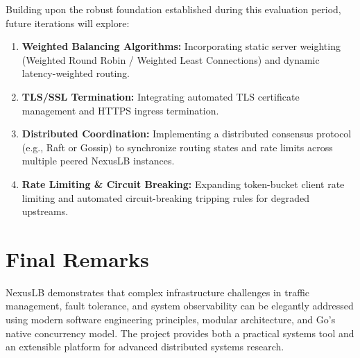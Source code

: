 \documentclass[12pt,openany]{report}
\begin{document}
Building upon the robust foundation established during this evaluation period, future iterations will explore:
\begin{enumerate}
  \item \textbf{Weighted Balancing Algorithms:} Incorporating static server weighting (Weighted Round Robin / Weighted Least Connections) and dynamic latency-weighted routing.
  \item \textbf{TLS/SSL Termination:} Integrating automated TLS certificate management and HTTPS ingress termination.
  \item \textbf{Distributed Coordination:} Implementing a distributed consensus protocol (e.g., Raft or Gossip) to synchronize routing states and rate limits across multiple peered NexusLB instances.
  \item \textbf{Rate Limiting \& Circuit Breaking:} Expanding token-bucket client rate limiting and automated circuit-breaking tripping rules for degraded upstreams.
\end{enumerate}

\section{Final Remarks}

NexusLB demonstrates that complex infrastructure challenges in traffic management, fault tolerance, and system observability can be elegantly addressed using modern software engineering principles, modular architecture, and Go's native concurrency model. The project provides both a practical systems tool and an extensible platform for advanced distributed systems research.

\clearpage
{}
{}
\end{document}
